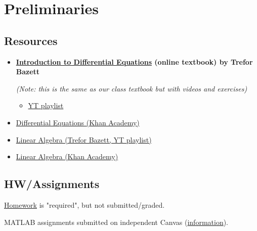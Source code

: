 \documentclass{article}
\begin{document}



\section{Preliminaries}
\subsection{Resources}
\begin{itemize}
\item \textbf{\href{https://web.uvic.ca/\~tbazett/diffyqs/frontmatter-1.html}{Introduction to Differential Equations} (online textbook) by Trefor Bazett}

\textit{(Note: this is the same as our class textbook but with videos and exercises)}
\begin{itemize}
\item \href{https://www.youtube.com/playlist?list=PLHXZ9OQGMqxde-SlgmWlCmNHroIWtujBw}{YT playlist}
\end{itemize}
\item \href{https://www.khanacademy.org/math/differential-equations}{Differential Equations (Khan Academy)}
\end{itemize}


\begin{itemize}
\item \href{https://www.youtube.com/playlist?list=PLHXZ9OQGMqxfUl0tcqPNTJsb7R6BqSLo6}{Linear Algebra (Trefor Bazett, YT playlist)}
\item \href{https://www.khanacademy.org/math/linear-algebra}{Linear Algebra (Khan Academy)}
\end{itemize}


\subsection{HW/Assignments}
\href{https://sites.math.rutgers.edu/\~shtelen/Teaching/Spring-2022/244\%20Recommended\%20Problems.pdf}{Homework} is "required", but not submitted/graded.

MATLAB assignments submitted on independent Canvas (\href{https://www.math.rutgers.edu/academics/undergraduate/courses/947-01-640-244-differential-equations-for-engineering-and-physics\#MATLAB}{information}).
\end{document}
